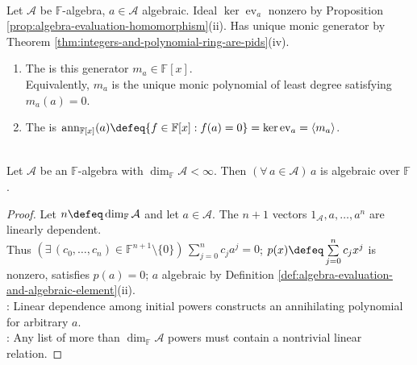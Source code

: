 \begin{definition} \label{def:algebraic-element-minimal-polynomial-algebra} \\
Let $\mathcal{A}$ be $\mathbb{F}$-algebra, $a\in\mathcal{A}$ algebraic. Ideal $\ker\operatorname{ev}_a$ nonzero by Proposition \ref{prop:algebra-evaluation-homomorphism}(ii). Has unique monic generator by Theorem \ref{thm:integers-and-polynomial-ring-are-pids}(iv).
\begin{enumerate}[label=(\roman*)]
\setlength{\itemsep}{0pt}
\item The  is this generator $m_a\in\mathbb{F}[x]$.\\
Equivalently, $m_a$ is the unique monic polynomial of least degree satisfying $m_a(a)=0$.
\item The  is $\operatorname{ann}_{\mathbb{F}[x]}(a)\defeq\{f\in\mathbb{F}[x]:f(a)=0\}=\ker\operatorname{ev}_a=\langle m_a\rangle$.
\end{enumerate}
\end{definition}

\begin{theorem} \label{thm:finite-dimensional-algebras-algebraic-elements} \\
Let $\mathcal{A}$ be an $\mathbb{F}$-algebra with $\dim_{\mathbb{F}}\mathcal{A}<\infty$. Then $(\forall\,a\in\mathcal{A})\,a$ is algebraic over $\mathbb{F}$.
\begin{proof}
Let $n\defeq\dim_{\mathbb{F}}\mathcal{A}$ and let $a\in\mathcal{A}$. The $n+1$ vectors $1_{\mathcal{A}},a,\ldots,a^n$ are linearly dependent.\\
Thus $(\exists\,(c_0,\ldots,c_n)\in\mathbb{F}^{n+1}\setminus\{0\})\,\sum\limits_{j=0}^{n}c_ja^j=0$; $p(x)\defeq\sum\limits_{j=0}^{n}c_jx^j$ is nonzero, satisfies $p(a)=0$; $a$ algebraic by Definition \ref{def:algebra-evaluation-and-algebraic-element}(ii).\\
: Linear dependence among initial powers constructs an annihilating polynomial for arbitrary $a$.\\
: Any list of more than $\dim_{\mathbb{F}}\mathcal{A}$ powers must contain a nontrivial linear relation.
\end{proof}
\end{theorem}

